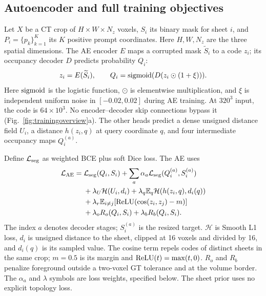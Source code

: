 \subsection{Autoencoder and full training objectives}
Let $X$ be a CT crop of $H\times W\times N_z$ voxels, $S_i$ its binary mask for
sheet $i$, and $P_i=\{p_k\}_{k=1}^{K}$ its $K$ positive prompt coordinates.
Here $H,W,N_z$ are the three spatial dimensions.
The AE encoder $E$ maps a corrupted mask $\widetilde S_i$ to a code $z_i$;
its occupancy decoder $D$ predicts probability $Q_i$:
\begin{equation}
 z_i=E(\widetilde S_i),\qquad Q_i=\operatorname{sigmoid}(D(z_i\odot(1+\xi))).
 \label{eq:ae}
\end{equation}
Here $\operatorname{sigmoid}$ is the logistic function, $\odot$ is elementwise multiplication,
and $\xi$ is independent uniform noise in $[-0.02,0.02]$ during AE training.
At $320^3$ input, the code is $64\times10^3$. No encoder--decoder skip
connections bypass it (Fig.~\ref{fig:trainingoverview}a). The other heads predict a dense
unsigned distance field $U_i$, a distance $h(z_i,q)$ at query coordinate $q$,
and four intermediate occupancy maps $Q_i^{(a)}$.

Define $\mathcal L_{\rm seg}$ as weighted BCE plus soft Dice loss. The AE uses
\begin{align}
 \mathcal L_{\rm AE}={}&\mathcal L_{\rm seg}(Q_i,S_i)
   +\sum_a\alpha_a\mathcal L_{\rm seg}(Q_i^{(a)},S_i^{(a)})\nonumber\\
 &+\lambda_U\mathcal H(U_i,d_i)
  +\lambda_q\mathbb E_q\mathcal H(h(z_i,q),d_i(q))\nonumber\\
 &+\lambda_r\mathbb E_{i\ne j}[\operatorname{ReLU}(\cos(z_i,z_j)-m)]\nonumber\\
 &+\lambda_o R_o(Q_i,S_i)+\lambda_b R_b(Q_i,S_i).
 \label{eq:aeloss}
\end{align}
The index $a$ denotes decoder stages; $S_i^{(a)}$ is the resized target.
$\mathcal H$ is Smooth L1 loss, $d_i$ is unsigned distance to the sheet,
clipped at 16 voxels and divided by 16, and $d_i(q)$ is its sampled value.
The cosine term repels codes of distinct sheets in the same crop; $m=0.5$
is its margin and $\operatorname{ReLU}(t)=\max(t,0)$. $R_o$ and $R_b$ penalize foreground
outside a two-voxel GT tolerance and at the volume border. The $\alpha_a$ and
$\lambda$ symbols are loss weights, specified below. The sheet prior uses no explicit topology loss.


